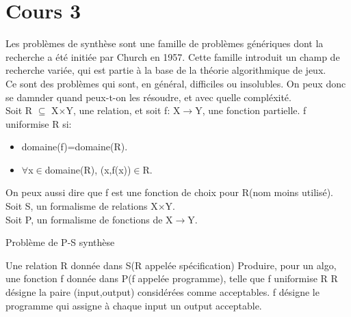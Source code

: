 \section{Cours 3}
Les probl\`emes de synth\`ese sont une famille de probl\`emes g\'en\'eriques dont la recherche a \'et\'e initi\'ee
par Church en 1957. Cette famille introduit un champ de recherche vari\'ee, qui est partie \`a la base de la th\'eorie
algorithmique de jeux.\\
Ce sont des probl\`emes qui sont, en g\'en\'eral, difficiles ou insolubles. On peux donc se damnder quand peux-t-on
les r\'esoudre, et avec quelle compl\'exit\'e.\\
\medskip
Soit R $\subseteq$ X$\times$Y, une relation, et soit f: X$\rightarrow$Y, une fonction partielle. f uniformise
R si:
\begin{itemize}
  \item domaine(f)=domaine(R).
  \item $\forall$x$\in$domaine(R), (x,f(x))$\in$R.
\end{itemize}
On peux aussi dire que f est une fonction de choix pour R(nom moins utilis\'e).\\
\medskip
Soit S, un formalisme de relations X$\times$Y.\\
Soit P, un formalisme de fonctions de X$\rightarrow$Y.\\
\begin{algorithm}
  \caption{Probl\`eme de P-S synth\`ese}
  \begin{algorithmic}
    \REQUIRE Une relation R donn\'ee dans S(R appel\'ee sp\'ecification)
    \ENSURE Produire, pour un algo, une fonction f donn\'ee dans P(f appel\'ee programme), telle que f
    uniformise R
    \STATE R d\'esigne la paire (input,output) consid\'er\'ees comme acceptables.
    \STATE f d\'esigne le programme qui assigne \`a chaque input un output acceptable.
  \end{algorithmic}
\end{algorithm}

